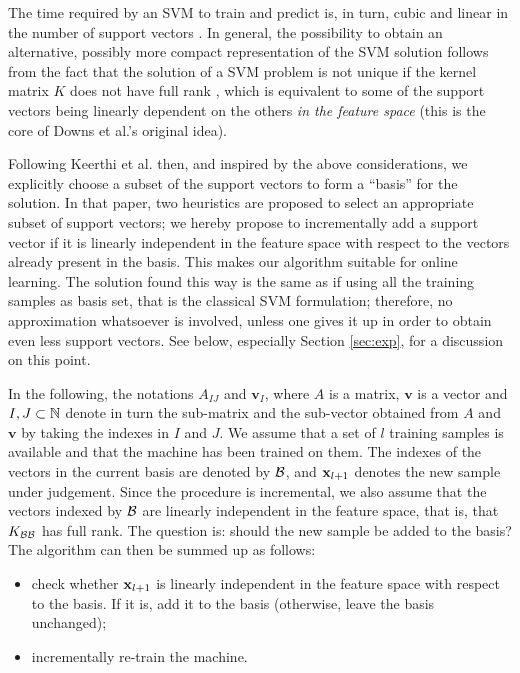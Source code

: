 The time required by an SVM to train and predict is, in turn, cubic
and linear in the number of support vectors \cite{KeerthiCDC06}. In
general, the possibility to obtain an alternative, possibly more
compact representation of the SVM solution follows from the fact that
the solution of a SVM problem is not unique if the kernel matrix $K$
does not have full rank \cite{Burges98}, which is equivalent to some
of the support vectors being linearly dependent on the others \emph{in
the feature space} (this is the core of Downs et al.'s
\cite{DownsGM01} original idea).

Following Keerthi et al. \cite{KeerthiCDC06} then, and inspired by the
above considerations, we explicitly choose a subset of the support
vectors to form a ``basis'' for the solution. In that paper, two
heuristics are proposed to select an appropriate subset of support
vectors; we hereby propose to incrementally add a support vector if it
is linearly independent in the feature space with respect to the
vectors already present in the basis. This makes our algorithm
suitable for online learning. The solution found this way is the same
as if using all the training samples as basis set, that is the
classical SVM formulation; therefore, no approximation whatsoever is
involved, unless one gives it up in order to obtain even less support
vectors. See below, especially Section \ref{sec:exp}, for a discussion
on this point.

In the following, the notations $A_{IJ}$ and $\mathbf{v}_I$, where $A$
is a matrix, $\mathbf{v}$ is a vector and $I,J \subset \mathbb{N}$ denote in
turn the sub-matrix and the sub-vector obtained from $A$ and
$\mathbf{v}$ by taking the indexes in $I$ and $J$. We assume that a
set of $l$ training samples is available and that the machine has been
trained on them. The indexes of the vectors in the current basis are
denoted by $\mathcal{B}$, and $\mathbf{x}_{l+1}$ denotes the new sample under
judgement. Since the procedure is incremental, we also assume that the
vectors indexed by $\mathcal{B}$ are linearly independent in the feature space,
that is, that $K_{\mathcal{B}\mathcal{B}}$ has full rank. The question is: should the
new sample be added to the basis? The algorithm can then be summed up
as follows:

\begin{itemize}

  \item check whether $\mathbf{x}_{l+1}$ is linearly independent in the
        feature space with respect to the basis. If it is, add it to
        the basis (otherwise, leave the basis unchanged);

  \item incrementally re-train the machine.

\end{itemize}

